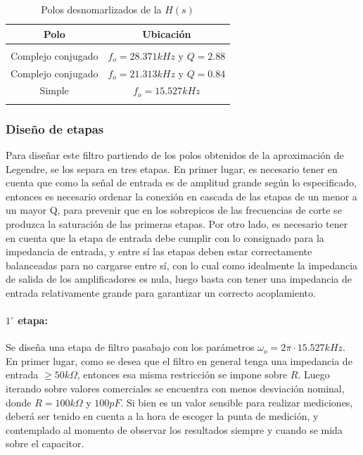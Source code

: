 \begin{table}[H]
    \centering
    \begin{tabular}{c | c}
        Polo & Ubicaci\'on \\
        \hline \\
        Complejo conjugado & $f_o = 28.371kHz$ y $Q = 2.88$ \\
        Complejo conjugado & $f_o = 21.313kHz$ y $Q = 0.84$\\
        Simple & $f_o = 15.527kHz$\\
        \\ \hline
    \end{tabular}
    \caption{Polos desnomarlizados de la $H(s)$}
\end{table}

\subsubsection{Dise\~no de etapas}
Para dise\~nar este filtro partiendo de los polos obtenidos de la aproximaci\'on de Legendre, se los separa en tres etapas. En primer lugar, es necesario tener en cuenta que como la se\~nal de entrada
es de amplitud grande seg\'un lo especificado, entonces es necesario ordenar la conexi\'on en cascada de las etapas de un menor a un mayor Q, para prevenir que en los sobrepicos de las frecuencias de corte
se produzca la saturaci\'on de las primeras etapas. Por otro lado, es necesario tener en cuenta que la etapa de entrada debe cumplir con lo consignado para la impedancia de entrada,
y entre s\'i las etapas deben estar correctamente balanceadas para no cargarse entre s\'i, con lo cual como idealmente la impedancia de salida de los amplificadores es nula, luego basta con tener una impedancia de entrada
relativamente grande para garantizar un correcto acoplamiento.

\paragraph{$1^{\circ}$ etapa:} Se dise\~na una etapa de filtro pasabajo con los par\'ametros $\omega_o = 2 \pi \cdot 15.527 kHz$. En primer lugar, como se desea que el filtro en general tenga una impedancia de entrada $\geq 50k \Omega$, entonces
esa misma restricci\'on se impone sobre $R$. Luego iterando sobre valores comerciales se encuentra con menos desviaci\'on nominal, donde $R = 100k \Omega$ y $100pF$. Si bien es un valor sensible para realizar mediciones, deber\'a ser tenido en cuenta
a la hora de escoger la punta de medici\'on, y contemplado al momento de observar los resultados siempre y cuando se mida sobre el capacitor.

